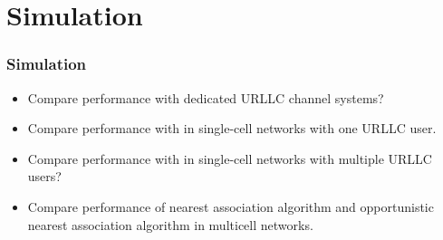 \section{Simulation}
\begin{frame}
  \frametitle{Simulation}
  \begin{itemize}
    \item Compare performance with dedicated URLLC channel systems?
    \item Compare performance with \cite{AVS20} in single-cell networks with one URLLC user.
    \item Compare performance with \cite{YZR21} in single-cell networks with multiple URLLC users?
    \item Compare performance of nearest association algorithm and opportunistic nearest association algorithm in multicell networks.
  \end{itemize}
\end{frame}

